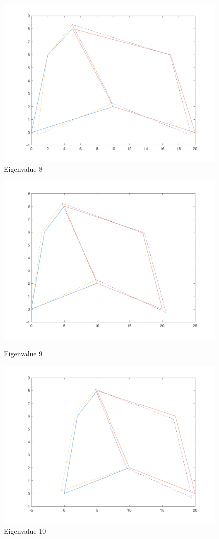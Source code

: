 \documentclass[11pt]{amsart}
\begin{document}
\begin{figure}[H]
\begin{minipage}[b]{0.5\linewidth}
    \centering
    \includegraphics[width=.5\linewidth]{eigenvectors/eigenvector_8_fullint.png} 
    \caption{Eigenvalue 8} 
    \vspace{4ex}
  \end{minipage} 
\end{figure}

\begin{figure}[H] 
  \label{fig3} 
  \begin{minipage}[b]{0.5\linewidth}
    \centering
    \includegraphics[width=.5\linewidth]{eigenvectors/eigenvector_9_fullint.png} 
    \caption{Eigenvalue 9} 
    \vspace{4ex}
  \end{minipage}%
  \begin{minipage}[b]{0.5\linewidth}
    \centering
    \includegraphics[width=.5\linewidth]{eigenvectors/eigenvector_10_fullint.png} 
    \caption{Eigenvalue 10} 
    \vspace{4ex}
  \end{minipage} 
  \begin{minipage}[b]{0.5\linewidth}

\end{minipage}
\end{figure}
\end{document}
